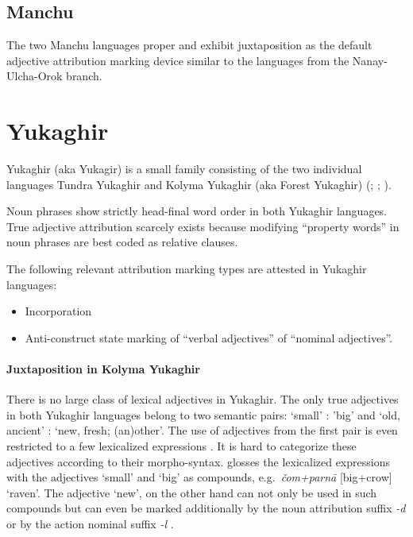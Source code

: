 \subsection{Manchu}
The two Manchu languages  proper and  exhibit juxtaposition as the default adjective attribution marking device similar to the languages from the Nanay-Ulcha-Orok branch.

\section{Yukaghir}\label{yukagir synchr}
Yukaghir (aka Yukagir) is a small family consisting of the two individual languages Tundra Yukaghir and Kolyma Yukaghir (aka Forest Yukaghir) (\citealt[223]{salminen2007}; \citealt[1–2]{maslova2003a}; \citealt[1]{maslova2003b}).

Noun phrases show strictly head-final word order in both Yukaghir languages. True adjective attribution scarcely exists because modifying “property words” in noun phrases are best coded as relative clauses.

The following relevant attribution marking types are attested in Yukaghir languages:
\begin{itemize}
\item Incorporation
\item Anti-construct state marking
	\subitem of “verbal adjectives”
	\subitem of “nominal adjectives”.
\end{itemize}

\paragraph{Juxtaposition in Kolyma Yukaghir}
There is no large class of lexical adjectives in Yukaghir. The only true adjectives in both Yukaghir languages belong to two semantic pairs: ‘small’ : ’big’ and ‘old, ancient’ : ‘new, fresh; (an)other’. The use of adjectives from the first pair is even restricted to a few lexicalized expressions \cite[70–71]{maslova2003b}. It is hard to categorize these adjectives according to their morpho-syntax. \citet[71]{maslova2003b} glosses the lexicalized expressions with the adjectives ‘small’ and ‘big’ as compounds, e.g.~\textit{čom+parnā} [big+crow] ‘raven’. The adjective ‘new’, on the other hand can not only be used in such compounds but can even be marked additionally by the noun attribution suffix \textit{-d} or by the action nominal suffix \textit{-l} \cite[71]{maslova2003b}.

